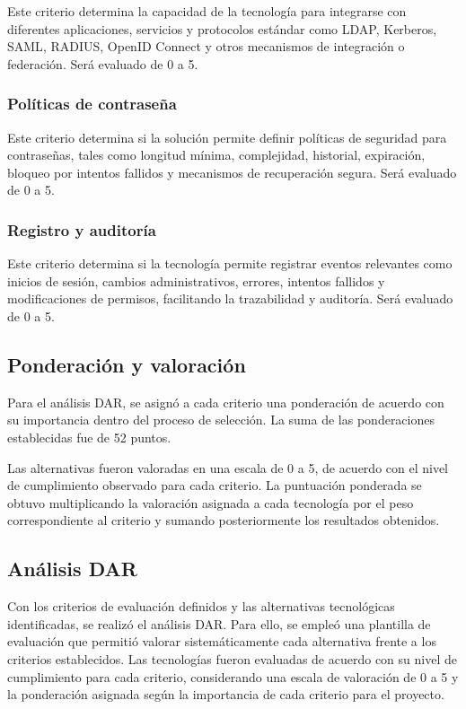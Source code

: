 Este criterio determina la capacidad de la tecnología para integrarse con diferentes aplicaciones, servicios y protocolos estándar como \ac{LDAP}, Kerberos, \ac{SAML}, \ac{RADIUS}, OpenID Connect y otros mecanismos de integración o federación. Será evaluado de 0 a 5.

\subsubsection{Políticas de contraseña}

Este criterio determina si la solución permite definir políticas de seguridad para contraseñas, tales como longitud mínima, complejidad, historial, expiración, bloqueo por intentos fallidos y mecanismos de recuperación segura. Será evaluado de 0 a 5.

\subsubsection{Registro y auditoría}

Este criterio determina si la tecnología permite registrar eventos relevantes como inicios de sesión, cambios administrativos, errores, intentos fallidos y modificaciones de permisos, facilitando la trazabilidad y auditoría. Será evaluado de 0 a 5.

\subsection{Ponderación y valoración}\label{subsec:dar-ponderacion}

Para el análisis \ac{DAR}, se asignó a cada criterio una ponderación de acuerdo con su importancia dentro del proceso de selección. La suma de las ponderaciones establecidas fue de 52 puntos.

Las alternativas fueron valoradas en una escala de 0 a 5, de acuerdo con el nivel de cumplimiento observado para cada criterio. La puntuación ponderada se obtuvo multiplicando la valoración asignada a cada tecnología por el peso correspondiente al criterio y sumando posteriormente los resultados obtenidos.

\subsection{Análisis \texorpdfstring{\acs{DAR}}{DAR}}\label{subsec:dar-analisis}

Con los criterios de evaluación definidos y las alternativas tecnológicas identificadas, se realizó el análisis \ac{DAR}. Para ello, se empleó una plantilla de evaluación que permitió valorar sistemáticamente cada alternativa frente a los criterios establecidos. Las tecnologías fueron evaluadas de acuerdo con su nivel de cumplimiento para cada criterio, considerando una escala de valoración de 0 a 5 y la ponderación asignada según la importancia de cada criterio para el proyecto.


